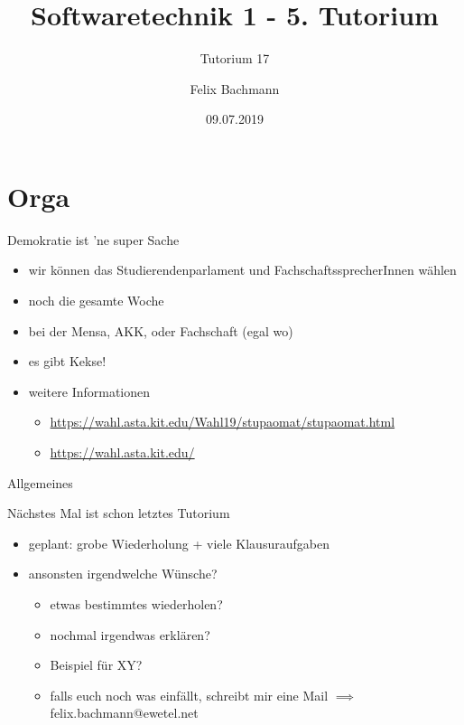 \documentclass[18pt]{beamer}
\title[SWT1]{Softwaretechnik 1 - 5. Tutorium}
\subtitle{Tutorium 17}
\author{Felix Bachmann}
\date{09.07.2019}
\institute{KIT - Institut für Programmstrukturen und Datenorganisation (IPD)}
\begin{document}
	
\begin{frame}
\titlepage
\end{frame}

\begin{frame}
\tableofcontents
\end{frame}


\section{Orga}
	\begin{frame}{Demokratie ist 'ne super Sache}
		\begin{itemize}
			\item wir können das Studierendenparlament und FachschaftssprecherInnen wählen
			\item noch die gesamte Woche
			\item bei der Mensa, AKK, oder Fachschaft (egal wo)
			\item es gibt Kekse!
			\item weitere Informationen
			\begin{itemize}
				\item \url{https://wahl.asta.kit.edu/Wahl19/stupaomat/stupaomat.html}
				\item \url{https://wahl.asta.kit.edu/}
			\end{itemize}
		\end{itemize}
	\end{frame}

	\begin{frame}{Allgemeines}
		\begin{alertblock}{Nächstes Mal ist schon letztes Tutorium} 
		\begin{itemize}
			\item geplant: grobe Wiederholung + viele Klausuraufgaben \pause
			\item ansonsten irgendwelche Wünsche?
			\begin{itemize}
				\item etwas bestimmtes wiederholen?
				\item nochmal irgendwas erklären?
				\item Beispiel für XY?
				\item falls euch noch was einfällt, schreibt mir eine Mail
				\linebreak $\implies$ felix.bachmann@ewetel.net
			\end{itemize}
		\end{itemize}
		\end{alertblock}
	\end{frame}
\end{document}
